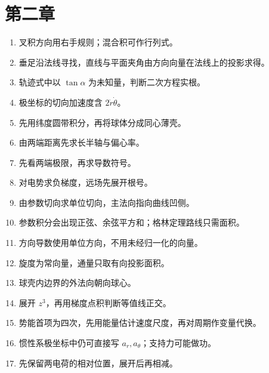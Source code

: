\documentclass[11pt,openany,fontset=fandol]{ctexbook}
\theoremstyle{plain}\newtheorem{theorem}{定理}[chapter]\newtheorem{proposition}[theorem]{命题}
\theoremstyle{definition}\newtheorem{definition}{定义}[chapter]\newtheorem{example}{例}[chapter]
\theoremstyle{remark}\newtheorem*{remark}{说明}
\begin{document}
\section{第二章}
\begin{enumerate}[label=2.\arabic*]
\item 叉积方向用右手规则；混合积可作行列式。
\item 垂足沿法线寻找，直线与平面夹角由方向向量在法线上的投影求得。
\item 轨迹式中以 $\tan\alpha$ 为未知量，判断二次方程实根。
\item 极坐标的切向加速度含 $2\dot r\dot\theta$。
\item 先用纬度圆带积分，再将球体分成同心薄壳。
\item 由两端距离先求长半轴与偏心率。
\item 先看两端极限，再求导数符号。
\item 对电势求负梯度，远场先展开根号。
\item 由参数切向求单位切向，主法向指向曲线凹侧。
\item 参数积分会出现正弦、余弦平方和；格林定理路线只需面积。
\item 方向导数使用单位方向，不用未经归一化的向量。
\item 旋度为常向量，通量只取有向投影面积。
\item 球壳内边界的外法向朝向球心。
\item 展开 $z^3$，再用梯度点积判断等值线正交。
\item 势能首项为四次，先用能量估计速度尺度，再对周期作变量代换。
\item 惯性系极坐标中仍可直接写 $a_r,a_\theta$；支持力可能做功。
\item 先保留两电荷的相对位置，展开后再相减。
\end{enumerate}
\end{document}
